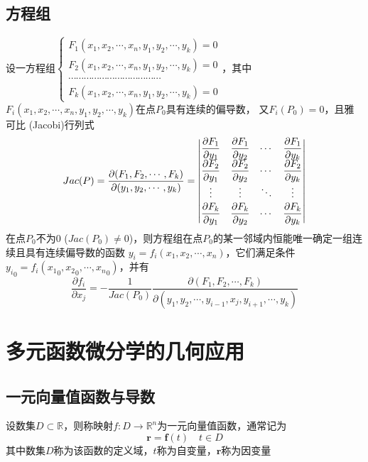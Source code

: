 \documentclass[UTF8]{ctexart}
\newcommand{\ve}[1]{{\bm{#1}}}
\begin{document}
\subsection*{方程组}
设一方程组$\displaystyle
\begin{cases}
  F_1(x_1,x_2,\cdots,x_n,y_1,y_2,\cdots,y_k)=0
\\F_2(x_1,x_2,\cdots,x_n,y_1,y_2,\cdots,y_k)=0
\\\cdots\cdots\cdots\cdots\cdots\cdots\cdots\cdots\cdots\cdots\cdots\cdots\\
  F_k(x_1,x_2,\cdots,x_n,y_1,y_2,\cdots,y_k)=0
\end{cases}$，其中$F_i(x_1,x_2,\cdots,x_n,y_1,y_2,\cdots,y_k)$在点$P_0$具有连续的偏导数，
又$F_i(P_0)=0$，且雅可比 (Jacobi)行列式
\[Jac(P)=\frac{\partial(F_1,F_2,\cdots,F_k)}{\partial(y_1,y_2,\cdots,y_k)}=
{
\renewcommand\arraystretch{1.5}
\begin{vmatrix}
  \displaystyle\frac{\partial F_1}{\partial y_1}&\displaystyle\frac{\partial F_1}{\partial y_2} &\displaystyle\cdots&\displaystyle\frac{\partial F_1}{\partial y_k} \\
  \displaystyle\frac{\partial F_2}{\partial y_1}&\displaystyle\frac{\partial F_2}{\partial y_2} &\displaystyle\cdots&\displaystyle\frac{\partial F_2}{\partial y_k} \\
  \displaystyle\vdots&\displaystyle\vdots&\displaystyle\ddots&\displaystyle\vdots \\
  \displaystyle\frac{\partial F_k}{\partial y_1}&\displaystyle\frac{\partial F_k}{\partial y_2} &\displaystyle\cdots&\displaystyle\frac{\partial F_k}{\partial y_k}
\end{vmatrix}
}
\]
在点$P_0$不为$0$ ($Jac(P_0)\ne0$)，则方程组在点$P_0$的某一邻域内恒能唯一确定一组连续且具有连续偏导数的函数
$y_i=f_i(x_1,x_2,\cdots,x_n)$，它们满足条件${y_i}_0=f_i({x_1}_0,{x_2}_0,\cdots,{x_n}_0)$，并有
\[\frac{\partial f_i}{\partial x_j}=-\frac{1}{Jac(P_0)}\frac{\partial(F_1,F_2,\cdots,F_k)}{\partial(y_1,y_2,\cdots,y_{i-1},x_j,y_{i+1},\cdots,y_k)}\]
\bigskip
\bigskip

\section*{多元函数微分学的几何应用}

\bigskip
\subsection*{一元向量值函数与导数}
设数集$D\subset\mathbb{R}$，则称映射$f:D\to\mathbb{R}^n$为一元向量值函数，通常记为
\[\ve{r}=\ve{f}(t)\quad t\in D\]
其中数集$D$称为该函数的定义域，$t$称为自变量，$\ve{r}$称为因变量
\end{document}
